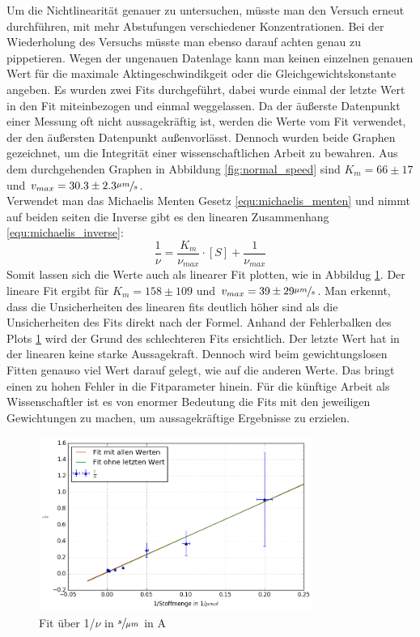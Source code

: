 Um die Nichtlinearität genauer zu untersuchen, müsste man den Versuch erneut durchführen, 
mit mehr Abstufungen verschiedener Konzentrationen.
Bei der Wiederholung des Versuchs müsste man ebenso darauf achten genau zu pippetieren.
Wegen der ungenauen Datenlage kann man keinen einzelnen genauen Wert für die maximale
Aktingeschwindikgeit oder die Gleichgewichtskonstante angeben.
Es wurden zwei Fits durchgeführt, dabei wurde einmal der letzte Wert in den Fit miteinbezogen und einmal weggelassen. Da der äußerste Datenpunkt einer Messung oft nicht aussagekräftig ist,
werden die Werte vom Fit verwendet, der den äußersten Datenpunkt außenvorlässt.
Dennoch wurden beide Graphen gezeichnet, um die Integrität einer wissenschaftlichen Arbeit zu bewahren.
Aus dem durchgehenden Graphen in Abbildung \ref{fig:normal_speed} sind $K_m = 66 \pm 17$ und $v_{max} = 30.3 \pm 2.3 \sfrac{\mu m}{s}$.\\ 
Verwendet man das Michaelis Menten Gesetz \ref{equ:michaelis_menten} und nimmt auf beiden seiten die Inverse gibt es den linearen Zusammenhang \ref{equ:michaelis_inverse}:
\begin{equation}
  \frac{1}{\nu} = \frac{K_m}{\nu_{max}} \cdot [S] + \frac{1}{\nu_{max}}
  \label{equ:michaelis_inverse}
\end{equation}
Somit lassen sich die Werte auch als linearer Fit plotten, wie in Abbildug \ref{fig:1_over_speed}.
Der lineare Fit ergibt für $K_m = 158 \pm 109$ und $v_{max} = 39 \pm 29 \sfrac{\mu m}{s}$.
Man erkennt, dass die Unsicherheiten des linearen fits
deutlich höher sind als die Unsicherheiten des Fits direkt nach der Formel.
Anhand der Fehlerbalken des Plots \ref{fig:1_over_speed} wird der Grund des schlechteren Fits ersichtlich. Der letzte Wert hat in der linearen keine starke Aussagekraft. Dennoch wird beim gewichtungslosen Fitten genauso viel Wert darauf gelegt, wie auf die anderen Werte.
Das bringt einen zu hohen Fehler in die Fitparameter hinein.
Für die künftige Arbeit als Wissenschaftler ist es von enormer Bedeutung die Fits mit den jeweiligen
Gewichtungen zu machen, um aussagekräftige Ergebnisse zu erzielen.
\begin{figure}[]
  \centering
  \includegraphics[width=0.8\textwidth]{bilder/both_fits_1over.png}
  \caption{Fit über 1/$\nu$  in $\sfrac{s}{\mu m}$ in A}
  \label{fig:1_over_speed}
\end{figure}

